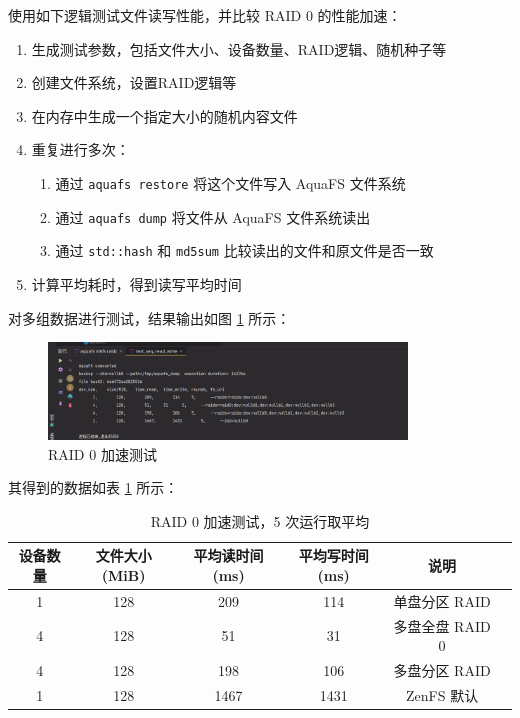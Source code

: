 使用如下逻辑测试文件读写性能，并比较 RAID 0 的性能加速：

\begin{enumerate}
  \item 生成测试参数，包括文件大小、设备数量、RAID逻辑、随机种子等
  \item 创建文件系统，设置RAID逻辑等
  \item 在内存中生成一个指定大小的随机内容文件
  \item 重复进行多次：
  \begin{enumerate}
    \item 通过 \verb|aquafs restore| 将这个文件写入 AquaFS 文件系统
    \item 通过 \verb|aquafs dump| 将文件从 AquaFS 文件系统读出
    \item 通过 \verb|std::hash| 和 \verb|md5sum| 比较读出的文件和原文件是否一致
  \end{enumerate}
  \item 计算平均耗时，得到读写平均时间
\end{enumerate}

对多组数据进行测试，结果输出如图 \ref{raid0-speedup} 所示：

\begin{figure}[htbp]
  \centering
  \includegraphics[width=0.85\textwidth]{fig/raid0-speedup}
  \caption{ RAID 0 加速测试 }
  \label{raid0-speedup}
\end{figure}

其得到的数据如表 \ref{raid0-speedup-table} 所示：

\begin{table}[htbp]
  \centering
  \caption{RAID 0 加速测试，5 次运行取平均}
  \label{raid0-speedup-table}
  \begin{tabular}{cccccc}
    \hline
    \textbf{设备数量} & \textbf{文件大小(MiB)} & \textbf{平均读时间(ms)} & \textbf{平均写时间(ms)} & \textbf{说明} \\
    \hline
    1 & 128 & 209 & 114 & 单盘分区 RAID \\
    4 & 128 & 51 & 31 & 多盘全盘 RAID 0 \\
    4 & 128 & 198 & 106 &  多盘分区 RAID \\
    1 & 128 & 1467 & 1431 &  ZenFS 默认 \\
    \hline
  \end{tabular}
\end{table}

